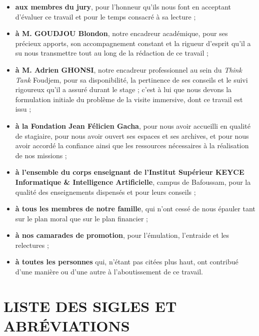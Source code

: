 \begin{itemize}
  \item \textbf{aux membres du jury}, pour l'honneur qu'ils nous font en
        acceptant d'évaluer ce travail et pour le temps consacré à sa lecture ;

  \item \textbf{à M. GOUDJOU Blondon}, notre encadreur académique, pour ses
        précieux apports, son accompagnement constant et la rigueur d'esprit
        qu'il a su nous transmettre tout au long de la rédaction de ce travail ;

  \item \textbf{à M. Adrien GHONSI}, notre encadreur professionnel au sein du
        \emph{Think Tank} Foudjem, pour sa disponibilité, la pertinence de ses
        conseils et le suivi rigoureux qu'il a assuré durant le stage ; c'est à
        lui que nous devons la formulation initiale du problème de la visite
        immersive, dont ce travail est issu ;

  \item \textbf{à la Fondation Jean Félicien Gacha}, pour nous avoir accueilli
        en qualité de stagiaire, pour nous avoir ouvert ses espaces et ses
        archives, et pour nous avoir accordé la confiance ainsi que les
        ressources nécessaires à la réalisation de nos missions ;

  \item \textbf{à l'ensemble du corps enseignant de l'Institut Supérieur KEYCE
        Informatique \& Intelligence Artificielle}, campus de Bafoussam, pour
        la qualité des enseignements dispensés et pour leurs conseils ;

  \item \textbf{à tous les membres de notre famille}, qui n'ont cessé de nous
        épauler tant sur le plan moral que sur le plan financier ;

  \item \textbf{à nos camarades de promotion}, pour l'émulation, l'entraide et
        les relectures ;

  \item \textbf{à toutes les personnes} qui, n'étant pas citées plus haut, ont
        contribué d'une manière ou d'une autre à l'aboutissement de ce travail.
\end{itemize}

\cleardoublepage
{}
\chapter*{LISTE DES SIGLES ET ABRÉVIATIONS}

